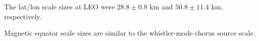 \documentclass[draft,linenumbers]{agujournal}
\begin{document}






\begin{keypoints}
\item The lat/lon scale sizes at LEO were $28.8 \pm 0.8$ km and $50.8 \pm 11.4$ km, respectively.
\item Magnetic equator scale sizes are similar to the whistler-mode chorus source scale.
\end{keypoints}

%
%

\end{document}
